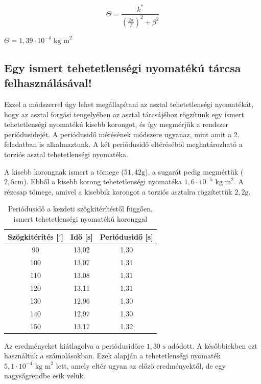 \documentclass{article}
\begin{document}
\[
\Theta = \frac{k^{*}}{\left(\frac{2\pi}{T}\right)^2 + \beta^2}
\]

$\Theta = 1,39 \cdot 10^{-4} \text{ kg m}^2$

\subsection{Egy ismert tehetetlenségi nyomatékú tárcsa felhasználásával!}

Ezzel a módszerrel úgy lehet megállapítani az asztal tehetetlenségi nyomatékát, hogy az asztal forgási tengelyében az asztal tárcsájéhoz rögzítünk egy ismert tehetetlenségi nyomatékú kisebb korongot, és így megmérjük a rendszer periódusidejét. A periódusidő mérésének módszere ugyanaz, mint amit a 2. feladatban is alkalmaztunk. A két periódusidő eltéréséből meghatározható a torziós asztal tehetetlenségi nyomatéka.

A kisebb korongnak ismert a tömege ($51,42 \text{g}$), a sugarát pedig megmértük ($2,5 \text{cm}$). Ebből a kisebb korong tehetetlenségi nyomatéka $1,6 \cdot 10^{-5} \text{ kg m}^2$. A rézcsap tömege, amivel a kisebbik korongot a torziós asztalra rögzítettük $2,2 \text{g}$.

\begin{table}[H]
    \centering
    \begin{tabular}{|c|c|c|}
        \hline
        Szögkitérítés [$^\circ$] & Idő [s] & Periódusidő [s] \\ \hline
        90                       & 13,02   & 1,30            \\ \hline 
        100                      & 13,07   & 1,31            \\ \hline
        110                      & 13,08   & 1,31            \\ \hline 
        120                      & 13,11   & 1,31            \\ \hline
        130                      & 12,96   & 1,30            \\ \hline 
        140                      & 12,97   & 1,30            \\ \hline
        150                      & 13,17   & 1,32            \\ \hline
    \end{tabular}
    \caption{Periódusidő a kezdeti szögkitérítéstől függően, ismert tehetetlenségi nyomatékú koronggal}
    \label{tab:periodusido_2}
\end{table}

Az eredményeket kiátlagolva a periódusidőre $1,30 \text{ s}$ adódott. A későbbiekben ezt használtuk a számolásokban. Ezek alapján a tehetetlenségi nyomaték $5,1 \cdot 10^{-4} \text{ kg m}^2$ lett, amely eltér ugyan az előző eredményektől, de egy nagyságrendbe esik velük.
\end{document}

